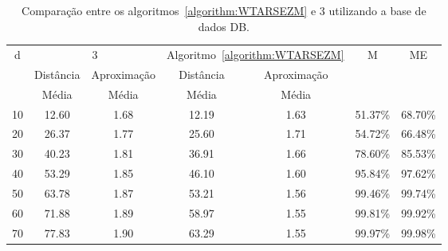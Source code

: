 \begin{table}[!htb]
  \caption{Comparação entre os algoritmos~\ref{algorithm:WTARSEZM} e 3\SbIRT{} utilizando a base de dados DB\textsubscript{\SbIRT}.}
  \label{table:ZZECIDRQ}
  \centering
  \begin{tabular}{|c|c|c|c|c|c|c|}
  \hline
           \multirow{3}{*}{d} &                   \multicolumn{2}{c|}{3\SbIRT{}}  & \multicolumn{2}{c|}{Algoritmo~\ref{algorithm:WTARSEZM}} &      \multirow{3}{*}{M} &     \multirow{3}{*}{ME} \\ \cline{2-5}
                              &               Distância &             Aproximação &                     Distância &             Aproximação &                         &                         \\
                              &                   Média &                   Média &                         Média &                   Média &                         &                         \\ \hline
  10                          &                   12.60 &                    1.68 &                         12.19 &                    1.63 &                 51.37\% &                 68.70\% \\ \hline
  20                          &                   26.37 &                    1.77 &                         25.60 &                    1.71 &                 54.72\% &                 66.48\% \\ \hline
  30                          &                   40.23 &                    1.81 &                         36.91 &                    1.66 &                 78.60\% &                 85.53\% \\ \hline
  40                          &                   53.29 &                    1.85 &                         46.10 &                    1.60 &                 95.84\% &                 97.62\% \\ \hline
  50                          &                   63.78 &                    1.87 &                         53.21 &                    1.56 &                 99.46\% &                 99.74\% \\ \hline
  60                          &                   71.88 &                    1.89 &                         58.97 &                    1.55 &                 99.81\% &                 99.92\% \\ \hline
  70                          &                   77.83 &                    1.90 &                         63.29 &                    1.55 &                 99.97\% &                 99.98\% \\ \hline

\end{tabular}
\end{table}
